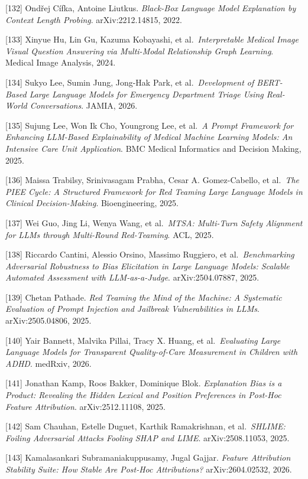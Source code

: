 {[}132{]} Ondřej Cífka, Antoine Liutkus. \emph{Black-Box Language Model Explanation by Context Length Probing}. arXiv:2212.14815, 2022.

{[}133{]} Xinyue Hu, Lin Gu, Kazuma Kobayashi, et al.~\emph{Interpretable Medical Image Visual Question Answering via Multi-Modal Relationship Graph Learning}. Medical Image Analysis, 2024.

{[}134{]} Sukyo Lee, Sumin Jung, Jong-Hak Park, et al.~\emph{Development of BERT-Based Large Language Models for Emergency Department Triage Using Real-World Conversations}. JAMIA, 2026.

{[}135{]} Sujung Lee, Won Ik Cho, Youngrong Lee, et al.~\emph{A Prompt Framework for Enhancing LLM-Based Explainability of Medical Machine Learning Models: An Intensive Care Unit Application}. BMC Medical Informatics and Decision Making, 2025.

{[}136{]} Maissa Trabilsy, Srinivasagam Prabha, Cesar A. Gomez-Cabello, et al.~\emph{The PIEE Cycle: A Structured Framework for Red Teaming Large Language Models in Clinical Decision-Making}. Bioengineering, 2025.

{[}137{]} Wei Guo, Jing Li, Wenya Wang, et al.~\emph{MTSA: Multi-Turn Safety Alignment for LLMs through Multi-Round Red-Teaming}. ACL, 2025.

{[}138{]} Riccardo Cantini, Alessio Orsino, Massimo Ruggiero, et al.~\emph{Benchmarking Adversarial Robustness to Bias Elicitation in Large Language Models: Scalable Automated Assessment with LLM-as-a-Judge}. arXiv:2504.07887, 2025.

{[}139{]} Chetan Pathade. \emph{Red Teaming the Mind of the Machine: A Systematic Evaluation of Prompt Injection and Jailbreak Vulnerabilities in LLMs}. arXiv:2505.04806, 2025.

{[}140{]} Yair Bannett, Malvika Pillai, Tracy X. Huang, et al.~\emph{Evaluating Large Language Models for Transparent Quality-of-Care Measurement in Children with ADHD}. medRxiv, 2026.

{[}141{]} Jonathan Kamp, Roos Bakker, Dominique Blok. \emph{Explanation Bias is a Product: Revealing the Hidden Lexical and Position Preferences in Post-Hoc Feature Attribution}. arXiv:2512.11108, 2025.

{[}142{]} Sam Chauhan, Estelle Duguet, Karthik Ramakrishnan, et al.~\emph{SHLIME: Foiling Adversarial Attacks Fooling SHAP and LIME}. arXiv:2508.11053, 2025.

{[}143{]} Kamalasankari Subramaniakuppusamy, Jugal Gajjar. \emph{Feature Attribution Stability Suite: How Stable Are Post-Hoc Attributions?} arXiv:2604.02532, 2026.

